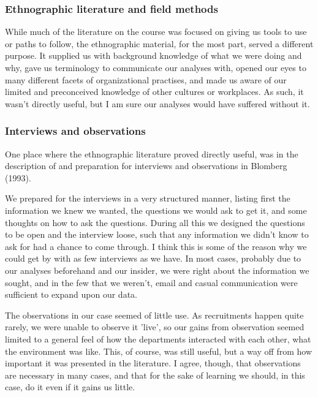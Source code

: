 \subsubsection{Ethnographic literature and field methods}
While much of the literature on the course was focused on giving us tools to use or paths to follow, the ethnographic material, for the most part, served a different purpose.
It supplied us with background knowledge of what we were doing and why, gave us terminology to communicate our analyses with, opened our eyes to many different facets of organizational practises, and made us aware of our limited and preconceived knowledge of other cultures or workplaces.
As such, it wasn't directly useful, but I am sure our analyses would have suffered without it.

\subsubsection{Interviews and observations}
One place where the ethnographic literature proved directly useful, was in the description of and preparation for interviews and observations in Blomberg (1993).

We prepared for the interviews in a very structured manner, listing first the information we knew we wanted, the questions we would ask to get it, and some thoughts on how to ask the questions.
During all this we designed the questions to be open and the interview loose, such that any information we didn't know to ask for had a chance to come through.
I think this is some of the reason why we could get by with as few interviews as we have. 
In most cases, probably due to our analyses beforehand and our insider, we were right about the information we sought, and in the few that we weren't, email and casual communication were sufficient to expand upon our data.

The observations in our case seemed of little use.
As recruitments happen quite rarely, we were unable to observe it 'live', so our gains from observation seemed limited to a general feel of how the departments interacted with each other, what the environment was like.
This, of course, was still useful, but a way off from how important it was presented in the literature.
I agree, though, that observations are necessary in many cases, and that for the sake of learning we should, in this case, do it even if it gains us little.
